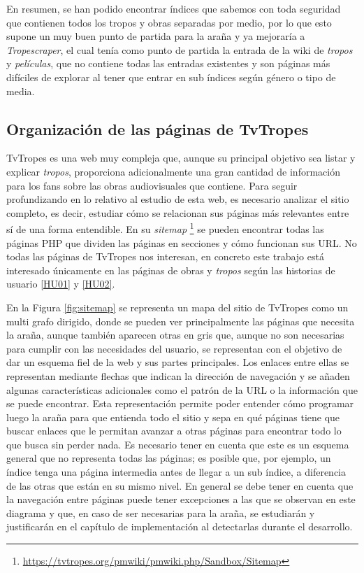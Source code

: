 En resumen, se han podido encontrar índices que sabemos con toda seguridad que
contienen todos los tropos y obras separadas por medio, por lo que esto supone
un muy buen punto de partida para la araña y ya mejoraría a
\textit{Tropescraper}, el cual tenía como punto de partida la entrada de la wiki
de \textit{tropos} y \textit{películas}, que no contiene todas las entradas
existentes y son páginas más difíciles de explorar al tener que entrar en sub
índices según género o tipo de media.

\subsection{Organización de las páginas de TvTropes}

TvTropes es una web muy compleja que, aunque su principal objetivo sea listar y
explicar \textit{tropos}, proporciona adicionalmente una gran cantidad de
información para los fans sobre las obras audiovisuales que contiene. Para
seguir profundizando en lo relativo al estudio de esta web, es necesario
analizar el sitio completo, es decir, estudiar cómo se relacionan sus páginas
más relevantes entre sí de una forma entendible. En su
\textit{sitemap}
\footnote{\url{https://tvtropes.org/pmwiki/pmwiki.php/Sandbox/Sitemap}} se
pueden encontrar todas las páginas PHP que dividen las páginas en secciones y
cómo funcionan sus URL. No todas las páginas de TvTropes nos interesan, en
concreto este trabajo está interesado únicamente en las páginas de obras y
\textit{tropos} según las historias de usuario
\href{https://github.com/jlgallego99/TropesToGo/issues/6}{[HU01]} y
\href{https://github.com/jlgallego99/TropesToGo/issues/7}{[HU02]}.

En la Figura \ref{fig:sitemap} se representa un mapa del sitio de TvTropes como
un multi grafo dirigido, donde se pueden ver principalmente las páginas que
necesita la araña, aunque también aparecen otras en gris que, aunque no son
necesarias para cumplir con las necesidades del usuario, se representan con el
objetivo de dar un esquema fiel de la web y sus partes principales. Los enlaces
entre ellas se representan mediante flechas que indican la dirección de
navegación y se añaden algunas características adicionales como el patrón de la
URL o la información que se puede encontrar. Esta representación permite poder
entender cómo programar luego la araña para que entienda todo el sitio y sepa en
qué páginas tiene que buscar enlaces que le permitan avanzar a otras páginas
para encontrar todo lo que busca sin perder nada. Es necesario tener en cuenta
que este es un esquema general que no representa todas las páginas; es posible
que, por ejemplo, un índice tenga una página intermedia antes de llegar a un sub
índice, a diferencia de las otras que están en su mismo nivel. En general se
debe tener en cuenta que la navegación entre páginas puede tener excepciones a
las que se observan en este diagrama y que, en caso de ser necesarias para la
araña, se estudiarán y justificarán en el capítulo de implementación al
detectarlas durante el desarrollo.

